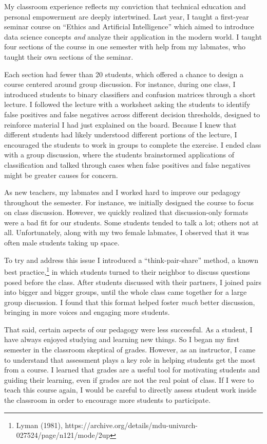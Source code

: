 \documentclass{article}
\begin{document}
My classroom experience reflects my conviction that technical education and personal empowerment are deeply intertwined. Last year, I taught a first-year seminar course on “Ethics and Artificial Intelligence” which aimed to introduce data science concepts \textit{and} analyze their application in the modern world. I taught four sections of the course in one semester with help from my labmates, who taught their own sections of the seminar.

Each section had fewer than 20 students, which offered a chance to design a course centered around group discussion. For instance, during one class, I introduced students to binary classifiers and confusion matrices through a short lecture. I followed the lecture with a worksheet asking the students to identify false positives and false negatives across different decision thresholds, designed to reinforce material I had just explained on the board. Because I knew that different students had likely understood different portions of the lecture, I encouraged the students to work in groups to complete the exercise. I ended class with a group discussion, where the students brainstormed applications of classification and talked through cases when false positives and false negatives might be greater causes for concern.

As new teachers, my labmates and I worked hard to improve our pedagogy throughout the semester. For instance, we initially designed the course to focus on class discussion. However, we quickly realized that discussion-only formats were a bad fit for our students. Some students tended to talk a lot; others not at all. Unfortunately, along with my two female labmates, I observed that it was often male students taking up space. 

To try and address this issue I introduced a “think-pair-share” method, a known best practice,\footnote{Lyman (1981),  https://archive.org/details/mdu-univarch-027524/page/n121/mode/2up} in which students turned to their neighbor to discuss questions posed before the class. After students discussed with their partners, I joined pairs into bigger and bigger groups, until the whole class came together for a large group discussion. I found that this format helped foster \textit{much} better discussion, bringing in more voices and engaging more students.

That said, certain aspects of our pedagogy were less successful. As a student, I have always enjoyed studying and learning new things. So I began my first semester in the classroom skeptical of grades. However, as an instructor, I came to understand that assessment plays a key role in helping students get the most from a course. I learned that grades are a useful tool for motivating students and guiding their learning, even if grades are not the real point of class. If I were to teach this course again, I would be careful to directly assess student work inside the classroom in order to encourage more students to participate. 
\end{document}
